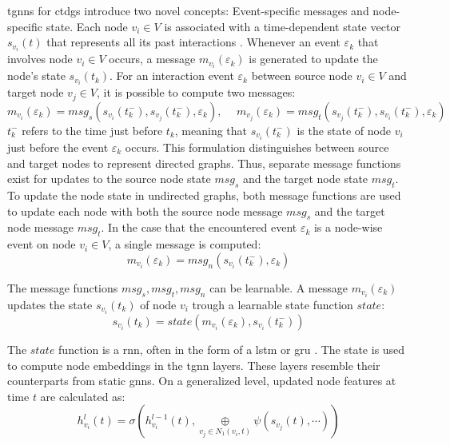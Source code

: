 \glspl{tgnn} for \glspl{ctdg} introduce two novel concepts: 
Event-specific messages and node-specific state. 
Each node $v_i \in V$ is associated with a time-dependent state vector $s_{v_i}(t)$ that represents all its past interactions \cite{longa_graph_2023}. Whenever an event $\varepsilon_{k}$ that involves node $v_i \in V$ occurs, a message $m_{v_i}(\varepsilon_{k})$ is generated to update the node's state $s_{v_i}(t_k)$. For an interaction event $\varepsilon_{k}$ between source node $v_i \in V$ and target node $v_j \in V$, it is possible to compute two messages:
\begin{equation}
    m_{v_i}(\varepsilon_{k}) = msg_s(s_{v_i}(t_k^-), s_{v_j}(t_k^-), \varepsilon_{k}), \hspace{15pt} m_{v_j}(\varepsilon_{k}) = msg_t(s_{v_j}(t_k^-), s_{v_i}(t_k^-), \varepsilon_{k})
\end{equation}
$t_k^-$ refers to the time just before $t_k$, meaning that $s_{v_i}(t_k^-)$ is the state of node $v_i$ just before the event $\varepsilon_{k}$ occurs. This formulation distinguishes between source and target nodes to represent directed graphs. Thus, separate message functions exist for updates to the source node state $msg_s$ and the target node state $msg_t$.
To update the node state in undirected graphs, both message functions are used to update each node with both the source node message $msg_s$ and the target node message $msg_t$. In the case that the encountered event $\varepsilon_{k}$ is a node-wise event on node $v_i \in V$, a single message is computed:
\begin{equation}
    m_{v_i}(\varepsilon_{k}) = msg_n(s_{v_i}(t_k^-), \varepsilon_{k})
\end{equation}

The message functions $msg_s, msg_t, msg_n$ can be learnable. A message $m_{v_i}(\varepsilon_{k})$ updates the state $s_{v_i}(t_k)$ of node $v_i$ trough a learnable state function $state$:
\begin{equation}
    s_{v_i}(t_k) = state(m_{v_i}(\varepsilon_{k}), s_{v_i}(t_k^-))
\end{equation}

The $state$ function is a \gls{rnn}, often in the form of a \gls{lstm} or \gls{gru} \cite{longa_graph_2023}.
The state is used to compute node embeddings in the \gls{tgnn} layers. These layers resemble their counterparts from static \glspl{gnn}. On a generalized level, updated node features at time $t$ are calculated as:
\begin{equation}
    h_{v_i}^l(t) = \sigma(h_{v_i}^{l-1}(t), \underset{v_j \in N_1(v_i, t)}{\oplus} \psi(s_{v_j}(t), \cdots))
\end{equation}

